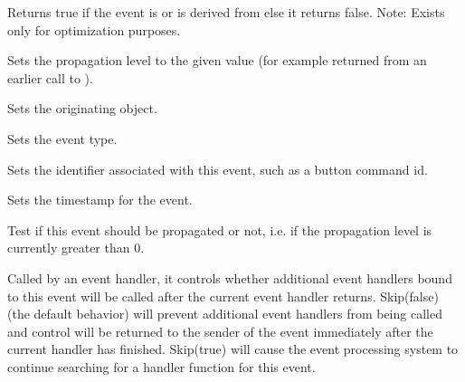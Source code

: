 \label{wxeventiscommandevent}


Returns true if the event is or is derived from
 else it returns false.
Note: Exists only for optimization purposes.


\label{wxeventresumepropagation}


Sets the propagation level to the given value (for example returned from an
earlier call to ).


\label{wxeventseteventobject}


Sets the originating object.


\label{wxeventseteventtype}


Sets the event type.


\label{wxeventsetid}


Sets the identifier associated with this event, such as a button command id.


\label{wxeventsettimestamp}


Sets the timestamp for the event.


\label{wxeventshouldpropagate}


Test if this event should be propagated or not, i.e. if the propagation level
is currently greater than $0$.


\label{wxeventskip}


Called by an event handler, it controls whether additional event
handlers bound to this event will be called after the current event
handler returns.  Skip(false) (the default behavior) will prevent
additional event handlers from being called and control will be
returned to the sender of the event immediately after the current
handler has finished.  Skip(true) will cause the event processing
system to continue searching for a handler function for this event.


